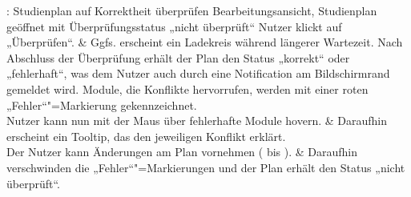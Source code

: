 \begin{usecase}{: Studienplan auf Korrektheit überprüfen}
	{Bearbeitungsansicht, Studienplan geöffnet mit Überprüfungsstatus „nicht überprüft“}
	Nutzer klickt auf „Überprüfen“.
	& Ggfs. erscheint ein Ladekreis während längerer Wartezeit. \newline 
	Nach Abschluss der Überprüfung erhält der Plan den Status „korrekt“ oder „fehlerhaft“, was dem Nutzer auch durch eine Notification am Bildschirmrand gemeldet wird. Module, die Konflikte hervorrufen, werden mit einer roten „Fehler“"=Markierung gekennzeichnet. \\
	\hline
	Nutzer kann nun mit der Maus über fehlerhafte Module hovern.
	& Daraufhin erscheint ein Tooltip, das den jeweiligen Konflikt erklärt. \\
	\hline
	Der Nutzer kann Änderungen am Plan vornehmen ( bis ). 
	& Daraufhin verschwinden die „Fehler“"=Markierungen und der Plan erhält den Status „nicht überprüft“.
\end{usecase}

